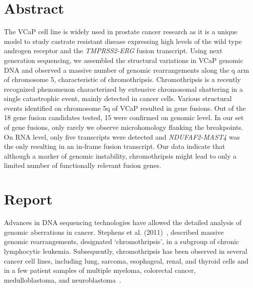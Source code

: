 \normalsize

\section*{Abstract}
The VCaP cell line is widely used in prostate cancer research as it is a unique model to study castrate resistant disease expressing high levels of
the wild type androgen receptor and the \textit{TMPRSS2-ERG} fusion transcript. Using next generation sequencing, we assembled the structural variations in
VCaP genomic DNA and observed a massive number of genomic rearrangements along the q arm of chromosome 5, characteristic of chromothripsis.
Chromothripsis is a recently recognized phenomenon characterized by extensive chromosomal shattering in a single catastrophic event, mainly detected
in cancer cells. Various structural events identified on chromosome 5q of VCaP resulted in gene fusions. Out of the 18 gene fusion candidates tested,
15 were confirmed on genomic level. In our set of gene fusions, only rarely we observe microhomology flanking the breakpoints. On RNA level, only five
transcripts were detected and \textit{NDUFAF2-MAST4} was the only resulting in an in-frame fusion transcript. Our data indicate that although a marker of genomic
instability, chromothripsis might lead to only a limited number of functionally relevant fusion genes.


\section*{Report}
Advances in DNA sequencing technologies have allowed the detailed analysis of genomic aberrations in cancer. Stephens et al. (2011)~\cite{stephens2011massive}, described massive genomic rearrangements, designated ‘chromothripsis’, in a subgroup of chronic lymphocytic leukemia. Subsequently, chromothripsis has been observed in several cancer cell lines, including lung, sarcoma, esophageal, renal, and thyroid cells and in a few patient samples of multiple myeloma, colorectal cancer, medulloblastoma, and neuroblastoma~\cite{magrangeas2011chromothripsis,kloosterman2011chromothripsis,rausch2012genome,molenaar2012sequencing}.

